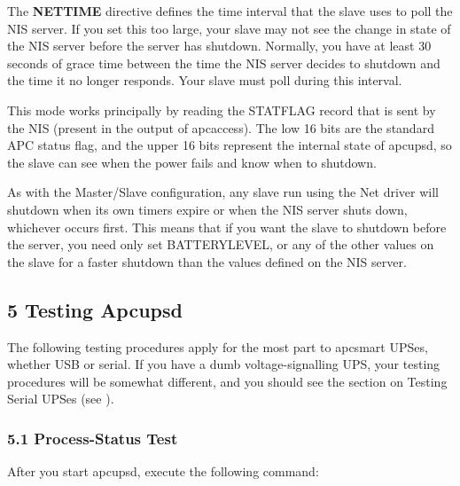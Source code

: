 The {\bf NETTIME} directive defines the time interval that the slave uses to
poll the NIS server. If you set this too large, your slave may not see the
change in state of the NIS server before the server has shutdown. Normally,
you have at least 30 seconds of grace time between the time the NIS server
decides to shutdown and the time it no longer responds. Your slave must poll
during this interval.  

This mode works principally by reading the STATFLAG record that is sent by the
NIS (present in the output of apcaccess). The low 16 bits are the standard APC
status flag, and the upper 16 bits represent the internal state of apcupsd, so
the slave can see when the power fails and know when to shutdown.  

As with the Master/Slave configuration, any slave run using the Net driver
will shutdown when its own timers expire or when the NIS server shuts down,
whichever occurs first. This means that if you want the slave to shutdown
before the server, you need only set BATTERYLEVEL, or any of the other values
on the slave for a faster shutdown than the values defined on the NIS server. 

\label{Testing-Apcupsd}

\subsection*{5 Testing Apcupsd}

\label{index-Testing-84}
The following testing procedures apply for the most part to apcsmart UPSes,
whether USB or serial.  If you have a dumb voltage-signalling UPS, your
testing procedures will be somewhat different, and you should see the section
on Testing Serial UPSes (see 
). 

\label{Process_002dStatus-Test}

\subsubsection*{5.1 Process-Status Test}

\label{index-Process-Status-Testing-85}
\label{index-Testing_002c-Process-Status-86}
After you start apcupsd, execute the following command: 

